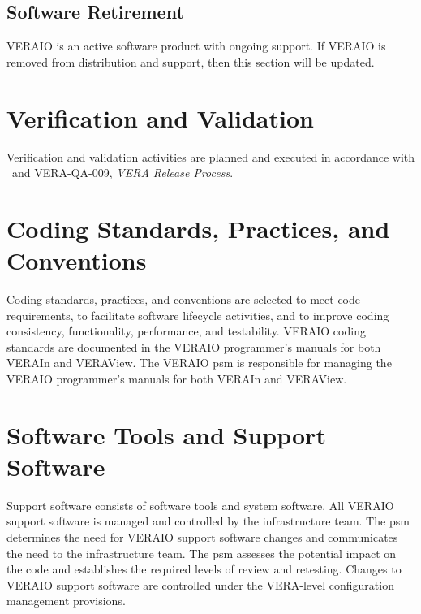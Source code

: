 \documentclass{vera-ornltm}
\begin{document}
\subsection{Software Retirement}

VERAIO is an active software product with ongoing support. If VERAIO is removed from distribution and support, then this section will be updated.


\section{Verification and Validation}

Verification and validation activities are planned and executed in accordance with \VERAReq\ and VERA-QA-009, {\it VERA Release Process}.


\section{Coding Standards, Practices, and Conventions}

Coding standards, practices, and conventions are selected to meet code requirements, to facilitate software lifecycle activities, and to improve coding consistency, functionality, performance, and testability.
VERAIO coding standards are documented in the VERAIO programmer's manuals for both VERAIn and VERAView.
The VERAIO \ac{psm} is responsible for managing the VERAIO programmer's manuals for both VERAIn and VERAView.


\section{Software Tools and Support Software}

Support software consists of software tools and system software.
All VERAIO support software is managed and controlled by the infrastructure team.
The \ac{psm} determines the need for VERAIO support software changes and communicates the need to the infrastructure team. The \ac{psm} assesses the potential impact on the code and establishes the required levels of review and retesting.
Changes to VERAIO support software are controlled under the VERA-level configuration management provisions.
\end{document}
